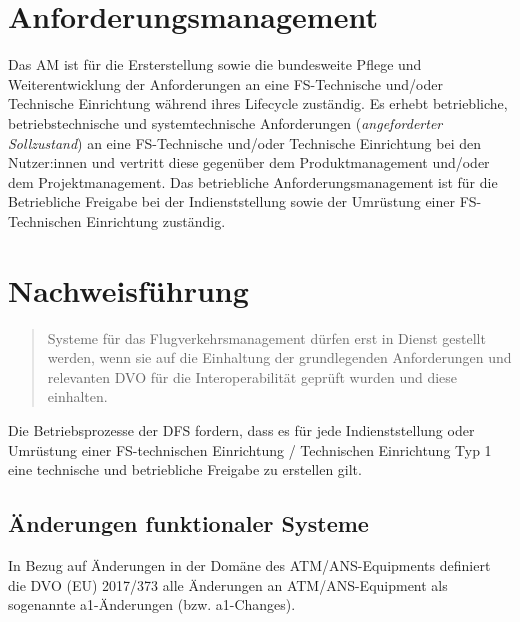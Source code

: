     \section{Anforderungsmanagement}

Das \acf{AM} ist für die Ersterstellung sowie die bundesweite Pflege und Weiterentwicklung der Anforderungen an eine FS-Technische und/oder Technische Einrichtung während ihres Lifecycle zuständig. 
Es erhebt betriebliche, betriebstechnische und systemtechnische Anforderungen (\textit{angeforderter Sollzustand}) an eine FS-Technische und/oder Technische Einrichtung bei den Nutzer:innen und vertritt diese gegenüber dem Produktmanagement und/oder dem Projektmanagement. 
Das betriebliche Anforderungsmanagement ist für die Betriebliche Freigabe bei der Indienststellung sowie der Umrüstung einer FS-Technischen Einrichtung zuständig. \cite[31]{ba_technik}


    \section{Nachweisführung}

\begin{quote}
    Systeme für das Flugverkehrsmanagement dürfen erst in Dienst gestellt werden, wenn sie auf die
Einhaltung der grundlegenden Anforderungen und relevanten DVO für die Interoperabilität
geprüft wurden und diese einhalten. \cite[17]{baf_iop}
\end{quote}


Die Betriebsprozesse der \ac{DFS} fordern, dass es für jede Indienststellung oder Umrüstung einer FS-technischen Einrichtung / Technischen Einrichtung Typ 1 eine technische und betriebliche Freigabe zu erstellen gilt. \cite[nf.][]{fa_freigaben}

\subsection{Änderungen funktionaler Systeme}


In Bezug auf Änderungen in der Domäne des ATM/ANS-Equipments definiert die DVO (EU) 2017/373 alle Änderungen an ATM/ANS-Equipment als sogenannte a1-Änderungen (bzw. a1-Changes).




